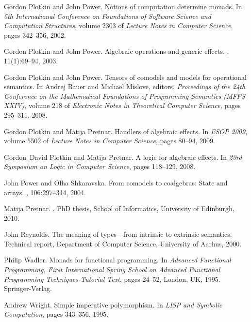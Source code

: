 \documentclass[10pt]{article}
\begin{document}
\begin{thebibliography}{10}
Gordon Plotkin and John Power.
\newblock Notions of computation determine monads.
\newblock In {\em 5th International Conference on Foundations of Software
  Science and Computation Structures}, volume 2303 of {\em Lecture Notes in
  Computer Science}, pages 342--356, 2002.

Gordon Plotkin and John Power.
\newblock Algebraic operations and generic effects.
, 11(1):69--94, 2003.

Gordon Plotkin and John Power.
\newblock Tensors of comodels and models for operational semantics.
\newblock In Andrej Bauer and Michael Mislove, editors, {\em Proceedings of the
  24th Conference on the Mathematical Foundations of Programming Semantics
  (MFPS XXIV)}, volume 218 of {\em Electronic Notes in Theoretical Computer
  Science}, pages 295--311, 2008.

Gordon Plotkin and Matija Pretnar.
\newblock Handlers of algebraic effects.
\newblock In {\em ESOP 2009}, volume 5502 of {\em Lecture Notes in Computer
  Science}, pages 80--94, 2009.

Gordon~David Plotkin and Matija Pretnar.
\newblock A logic for algebraic effects.
\newblock In {\em 23rd Symposium on Logic in Computer Science}, pages 118--129,
  2008.

John Power and Olha Shkaravska.
\newblock From comodels to coalgebras: State and arrays.
, 106:297--314,
  2004.

Matija Pretnar.
.
\newblock PhD thesis, School of Informatics, University of Edinburgh, 2010.

John Reynolds.
\newblock The meaning of types---from intrinsic to extrinsic semantics.
\newblock Technical report, Department of Computer Science, University of
  Aarhus, 2000.

Philip Wadler.
\newblock Monads for functional programming.
\newblock In {\em Advanced Functional Programming, First International Spring
  School on Advanced Functional Programming Techniques-Tutorial Text}, pages
  24--52, London, UK, 1995. Springer-Verlag.

Andrew Wright.
\newblock Simple imperative polymorphism.
\newblock In {\em LISP and Symbolic Computation}, pages 343--356, 1995.

\end{thebibliography}


\end{document}
